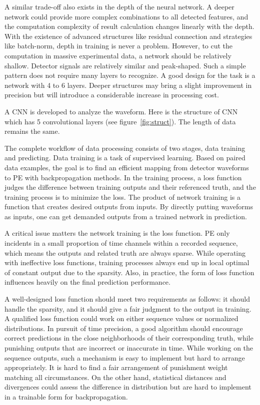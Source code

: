 A similar trade-off also exists in the depth of the neural network. A deeper network could provide more complex combinations to all detected features, and the computation complexity of result calculation changes linearly with the depth. With the existence of advanced structures like residual connection and strategies like batch-norm, depth in training is never a problem. However, to cut the computation in massive experimental data, a network should be relatively shallow. Detector signals are relatively similar and peak-shaped. Such a simple pattern does not require many layers to recognize. A good design for the task is a network with 4 to 6 layers. Deeper structures may bring a slight improvement in precision but will introduce a considerable increase in processing cost.

A CNN is developed to analyze the waveform. Here is the structure of CNN which has 5 convolutional layers (see figure~\ref{fig:struct}). The length of data remains the same. 


The complete workflow of data processing consists of two stages, data training and predicting. Data training is a task of supervised learning.  Based on paired data examples, the goal is to find an efficient mapping from detector waveforms to PE with backpropagation methods. In the training process, a loss function judges the difference between training outputs and their referenced truth, and the training process is to minimize the loss. The product of network training is a function that creates desired outputs from inputs. By directly putting waveforms as inputs, one can get demanded outputs from a trained network in prediction.


A critical issue matters the network training is the loss function. PE only incidents in a small proportion of time channels within a recorded sequence, which means the outputs and related truth are always sparse. While operating with ineffective loss functions, training processes always end up in local optimal of constant output due to the sparsity. Also, in practice, the form of loss function influences heavily on the final prediction performance. 

A well-designed loss function should meet two requirements as follows: it should handle the sparsity, and it should give a fair judgment to the output in training. A qualified loss function could work on either sequence values or normalized distributions. In pursuit of time precision, a good algorithm should encourage correct predictions in the close neighborhoods of their corresponding truth, while punishing outputs that are incorrect or inaccurate in time. While working on the sequence outputs, such a mechanism is easy to implement but hard to arrange appropriately. It is hard to find a fair arrangement of punishment weight matching all circumstances. On the other hand, statistical distances and divergences could assess the difference in distribution but are hard to implement in a trainable form for backpropagation. 

